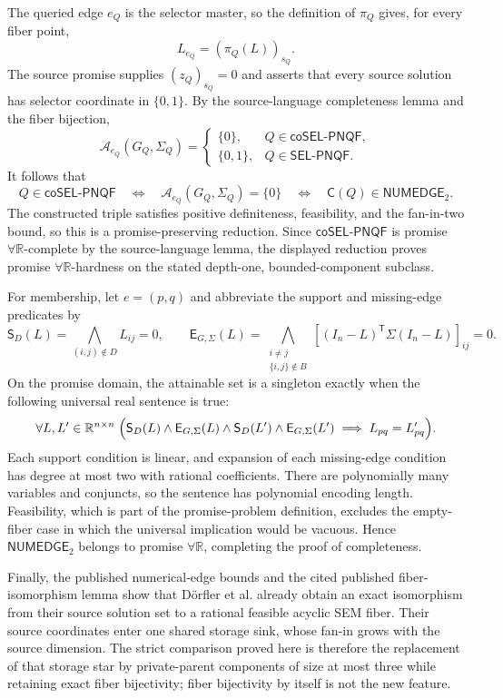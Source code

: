 The queried edge \(e_Q\) is the selector master, so the definition of \(\pi_Q\) gives, for every fiber point,
\[
L_{e_Q}=(\pi_Q(L))_{s_Q}.
\]
The source promise supplies \((z_Q)_{s_Q}=0\) and asserts that every source solution has selector coordinate in \(\{0,1\}\).  By the source-language completeness lemma and the fiber bijection,
\[
\mathcal A_{e_Q}(G_Q,\Sigma_Q)
=\begin{cases}
\{0\},&Q\in\mathsf{coSEL\mbox{-}PNQF},\\
\{0,1\},&Q\in\mathsf{SEL\mbox{-}PNQF}.
\end{cases}
\]
It follows that
\[
Q\in\mathsf{coSEL\mbox{-}PNQF}
\quad\Longleftrightarrow\quad
\mathcal A_{e_Q}(G_Q,\Sigma_Q)=\{0\}
\quad\Longleftrightarrow\quad
\mathsf C(Q)\in\mathsf{NUMEDGE}_2.
\]
The constructed triple satisfies positive definiteness, feasibility, and the fan-in-two bound, so this is a promise-preserving reduction.  Since \(\mathsf{coSEL\mbox{-}PNQF}\) is promise \(\forall\mathbb R\)-complete by the source-language lemma, the displayed reduction proves promise \(\forall\mathbb R\)-hardness on the stated depth-one, bounded-component subclass.

For membership, let \(e=(p,q)\) and abbreviate the support and missing-edge predicates by
\[
\mathsf S_D(L)=\bigwedge_{(i,j)\notin D}L_{ij}=0,
\qquad
\mathsf E_{G,\Sigma}(L)=
\bigwedge_{\substack{i\ne j\\\{i,j\}\notin B}}
\left[(I_n-L)^{\mathsf T}\Sigma(I_n-L)\right]_{ij}=0.
\]
On the promise domain, the attainable set is a singleton exactly when the following universal real sentence is true:
\[
\forall L,L'\in\mathbb R^{n\times n}\;\Bigl(
\mathsf S_D(L)\wedge\mathsf E_{G,\Sigma}(L)
\wedge\mathsf S_D(L')\wedge\mathsf E_{G,\Sigma}(L')
\;\Longrightarrow\;L_{pq}=L'_{pq}
\Bigr).
\]
Each support condition is linear, and expansion of each missing-edge condition has degree at most two with rational coefficients.  There are polynomially many variables and conjuncts, so the sentence has polynomial encoding length.  Feasibility, which is part of the promise-problem definition, excludes the empty-fiber case in which the universal implication would be vacuous.  Hence \(\mathsf{NUMEDGE}_2\) belongs to promise \(\forall\mathbb R\), completing the proof of completeness.

Finally, the published numerical-edge bounds and the cited published fiber-isomorphism lemma show that Dörfler et al. already obtain an exact isomorphism from their source solution set to a rational feasible acyclic SEM fiber.  Their source coordinates enter one shared storage sink, whose fan-in grows with the source dimension.  The strict comparison proved here is therefore the replacement of that storage star by private-parent components of size at most three while retaining exact fiber bijectivity; fiber bijectivity by itself is not the new feature.

